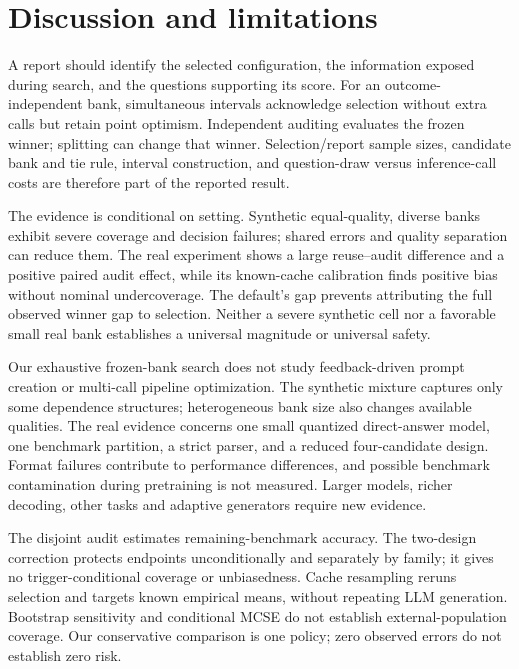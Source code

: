 \section{Discussion and limitations}
A report should identify the selected configuration, the information exposed during search, and the questions supporting its score. For an outcome-independent bank, simultaneous intervals acknowledge selection without extra calls but retain point optimism. Independent auditing evaluates the frozen winner; splitting can change that winner. Selection/report sample sizes, candidate bank and tie rule, interval construction, and question-draw versus inference-call costs are therefore part of the reported result.

The evidence is conditional on setting. Synthetic equal-quality, diverse banks exhibit severe coverage and decision failures; shared errors and quality separation can reduce them. The real experiment shows a large reuse--audit difference and a positive paired audit effect, while its known-cache calibration finds positive bias without nominal undercoverage. The default's gap prevents attributing the full observed winner gap to selection. Neither a severe synthetic cell nor a favorable small real bank establishes a universal magnitude or universal safety.

Our exhaustive frozen-bank search does not study feedback-driven prompt creation or multi-call pipeline optimization. The synthetic mixture captures only some dependence structures; heterogeneous bank size also changes available qualities. The real evidence concerns one small quantized direct-answer model, one benchmark partition, a strict parser, and a reduced four-candidate design. Format failures contribute to performance differences, and possible benchmark contamination during pretraining is not measured. Larger models, richer decoding, other tasks and adaptive generators require new evidence.

The disjoint audit estimates remaining-benchmark accuracy. The two-design correction protects endpoints unconditionally and separately by family; it gives no trigger-conditional coverage or unbiasedness. Cache resampling reruns selection and targets known empirical means, without repeating LLM generation. Bootstrap sensitivity and conditional MCSE do not establish external-population coverage. Our conservative comparison is one policy; zero observed errors do not establish zero risk.
